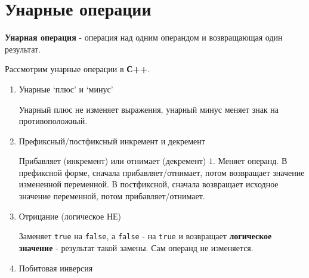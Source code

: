 \section{Унарные
операции}\label{ux443ux43dux430ux440ux43dux44bux435-ux43eux43fux435ux440ux430ux446ux438ux438}

\textbf{Унарная операция} - операция над одним операндом и возвращающая
один результат.

Рассмотрим унарные операции в \textbf{С++}.

\begin{enumerate}
\def\labelenumi{\arabic{enumi})}
\item
  Унарные `плюс' и `минус'

\begin{Shaded}
\begin{Highlighting}[]
\OperatorTok{+}\OperatorTok{;}
\OperatorTok{{-}}\OperatorTok{;}
\end{Highlighting}
\end{Shaded}

  Унарный плюс не изменяет выражения, унарный минус меняет знак на
  противоположный.
\item
  Префиксный/постфиксный инкремент и декремент

\begin{Shaded}
\begin{Highlighting}[]
\OperatorTok{++}\OperatorTok{;}
\OperatorTok{++;}
\OperatorTok{{-}{-}}\OperatorTok{;}
\OperatorTok{{-}{-};}
\end{Highlighting}
\end{Shaded}

  Прибавляет (инкремент) или отнимает (декремент) \(1\). Меняет операнд.
  В префиксной форме, сначала прибавляет/отнимает, потом возвращает
  значение измененной переменной. В постфиксной, сначала возвращает
  исходное значение переменной, потом прибавляет/отнимает.
\item
  Отрицание (логическое НЕ)

\begin{Shaded}
\begin{Highlighting}[]
\OperatorTok{!}\OperatorTok{;}
\end{Highlighting}
\end{Shaded}

  Заменяет \texttt{true} на \texttt{false}, а \texttt{false} - на
  \texttt{true} и возвращает \textbf{логическое значение} - результат
  такой замены. Сам операнд не изменяется.
\item
  Побитовая инверсия


\end{enumerate}

